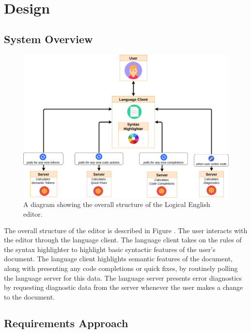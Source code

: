 \documentclass[../main.tex]{subfiles}
\begin{document}
\chapter{Design}
\section{System Overview}
\begin{figure}[h!]
\centering
\includegraphics[width = \linewidth]{./figures/le-editor.png}
\caption{A diagram showing the overall structure of the Logical English editor.}
\label{fig:system-overview}
\end{figure}
The overall structure of the editor is described in Figure \cite{fig:system-overview}. The user interacts with the editor through the language client. The language client takes on the rules of the syntax highlighter to highlight basic syntactic features of the user's document. The language client highlights semantic features of the document, along with presenting any code completions or quick fixes, by routinely polling the language server for this data. The language server presents error diagnostics by requesting diagnostic data from the server whenever the user makes a change to the document.

\section{Requirements Approach}
\end{document}
